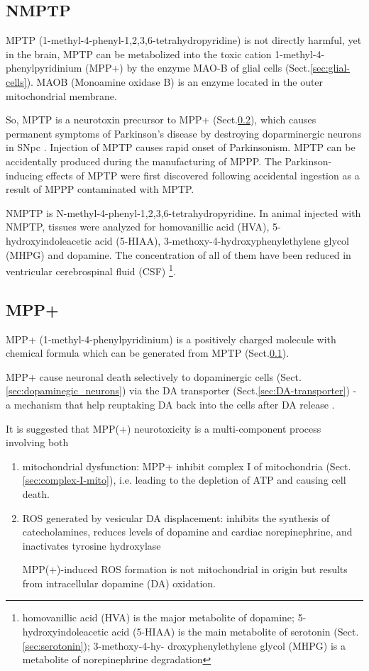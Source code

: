 \subsection{NMPTP}
\label{sec:NMPTP}

MPTP (1-methyl-4-phenyl-1,2,3,6-tetrahydropyridine) 
is not directly harmful, yet in the brain, MPTP can be metabolized into
the toxic cation 1-methyl-4-phenylpyridinium (MPP+) by the enzyme MAO-B of glial
cells (Sect.\ref{sec:glial-cells}). MAOB (Monoamine oxidase B) is an enzyme
located in the outer mitochondrial membrane.
 
So, MPTP is a neurotoxin precursor to MPP+ (Sect.\ref{sec:MPP+}), which causes
permanent symptoms of Parkinson's disease by destroying doparminergic neurons in
SNpc \citep{burns1983}. Injection of MPTP causes rapid onset of
Parkinsonism.
MPTP can be accidentally produced during the manufacturing of MPPP.
The Parkinson-inducing effects of MPTP were first discovered following
accidental ingestion as a result of MPPP contaminated with MPTP.

NMPTP is N-methyl-4-phenyl-1,2,3,6-tetrahydropyridine.
In animal injected with NMPTP, tissues were analyzed for homovanillic acid
(HVA), 5-hydroxyindoleacetic acid (5-HIAA), 3-methoxy-4-hydroxyphenylethylene glycol
(MHPG) and dopamine. The concentration of all of them have been reduced in
ventricular cerebrospinal fluid (CSF) \footnote{homovanillic acid (HVA) is the
major  metabolite of dopamine;  5-hydroxyindoleacetic acid (5-HIAA) is the main
metabolite of serotonin  (Sect.\ref{sec:serotonin}); 3-methoxy-4-hy-
droxyphenylethylene glycol (MHPG) is a metabolite of norepinephrine
degradation}.

\subsection{MPP+}
\label{sec:MPP+}

MPP+ (1-methyl-4-phenylpyridinium) is a positively charged molecule with
chemical formula 
which can be generated from MPTP (Sect.\ref{sec:NMPTP}).

MPP+ cause neuronal death selectively to dopaminergic cells
(Sect.\ref{sec:dopaminegic_neurons}) via the DA transporter
(Sect.\ref{sec:DA-transporter}) - a mechanism that help reuptaking DA back into
the cells after DA release \citep{gainetdinov1997}.
 
It is suggested that MPP(+) neurotoxicity is a multi-component process involving
both
\begin{enumerate}
  \item mitochondrial dysfunction: MPP+ inhibit complex I of mitochondria
  (Sect.\ref{sec:complex-I-mito}), i.e. leading to the depletion of ATP and causing cell death.

  
  \item ROS generated by vesicular DA displacement: 
  inhibits the synthesis of
  catecholamines, reduces levels of dopamine and cardiac norepinephrine, and inactivates tyrosine hydroxylase
  
  MPP(+)-induced ROS formation is not mitochondrial in origin but results from
  intracellular dopamine (DA) oxidation.
\end{enumerate}

